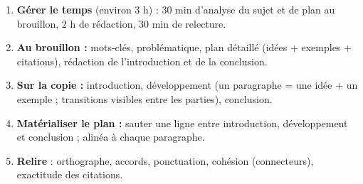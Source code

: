 \documentclass[11pt]{article}
\begin{document}
\begin{methode}
\begin{enumerate}
\item \textbf{Gérer le temps} (environ 3 h) : 30 min d'analyse du sujet et de plan au brouillon, 2 h de rédaction, 30 min de relecture.
\item \textbf{Au brouillon :} mots-clés, problématique, plan détaillé (idées + exemples + citations), rédaction de l'introduction et de la conclusion.
\item \textbf{Sur la copie :} introduction, développement (un paragraphe = une idée + un exemple ; transitions visibles entre les parties), conclusion.
\item \textbf{Matérialiser le plan :} sauter une ligne entre introduction, développement et conclusion ; alinéa à chaque paragraphe.
\item \textbf{Relire} : orthographe, accords, ponctuation, cohésion (connecteurs), exactitude des citations.
\end{enumerate}
\end{methode}
\end{document}
